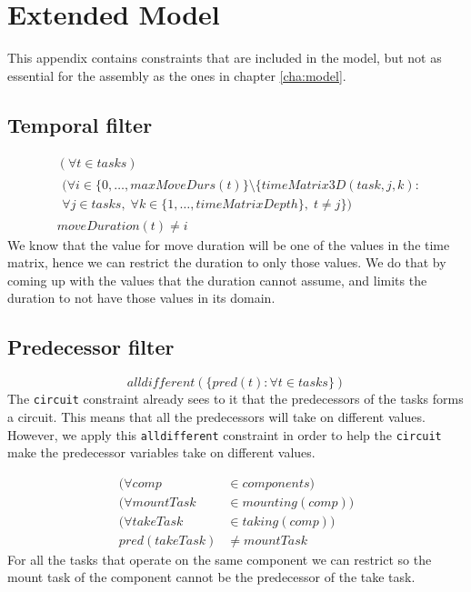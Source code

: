  \chapter{Extended Model}\label{app:ext_mod}
This appendix contains constraints that are included in the model, but not as essential for the assembly as the ones in chapter \ref{cha:model}.

\section{Temporal filter}
  \begin{equation}
  \begin{aligned}\label{eq:67}
  &(\forall t \in tasks)\\
  &\begin{aligned}
  (\forall i \in \{0 , \ldots , maxMoveDurs(t)\} \setminus \{timeMatrix3D(task,j,k) :\\
  \forall j \in tasks, \; \forall k \in \{1 , \ldots , timeMatrixDepth\}, \; t \neq j\})
  \end{aligned}\\
  &moveDuration(t) \neq i
  \end{aligned}
  \end{equation}
 We know that the value for move duration will be one of the values in the time matrix, hence we can restrict the duration to only those values. We do that by coming up with the values that the duration cannot assume, and limits the duration to not have those values in its domain.

\section{Predecessor filter}
\begin{equation}\label{eq:74}
  alldifferent(\{pred(t) : \forall t \in tasks\})
  \end{equation}
 The \texttt{circuit} constraint already sees to it that the predecessors of the tasks forms a circuit. This means that all the predecessors will take on different values. However, we apply this \texttt{alldifferent} constraint in order to help the \texttt{circuit} make the predecessor variables take on different values.

 \begin{equation}
  \begin{aligned}\label{eq:85}
  (\forall comp &\in components) \\
  (\forall mountTask &\in mounting(comp)) \\
  (\forall takeTask &\in taking(comp)) \\
  pred(takeTask) &\neq mountTask
  \end{aligned}
  \end{equation}
  For all the tasks that operate on the same component we can restrict so the mount task of the component cannot be the predecessor of the take task. 
  

